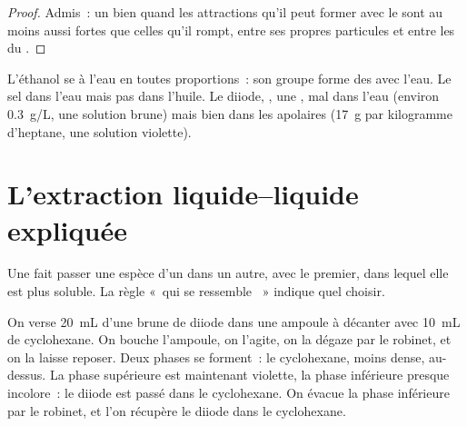 \begin{proof}
Admis~: un   bien quand les attractions qu'il peut
former avec le  sont au moins aussi fortes que celles qu'il
rompt, entre ses propres particules et entre les  du .
\end{proof}

\begin{example}\label{ex:g11:dissolution:cases}
L'éthanol se  à l'eau en toutes proportions~: son groupe 
forme des  avec l'eau. Le sel  dans l'eau
mais pas dans l'huile. Le diiode, , une ,  mal dans l'eau (environ \qty{0.3}{g/L}, une solution brune) mais
bien dans les  apolaires (\qty{17}{g} par kilogramme d'heptane,
une solution violette).
\end{example}

\section{L'extraction liquide--liquide expliquée}

Une  fait passer une espèce d'un  dans
un autre,  avec le premier, dans lequel elle est plus
soluble. La règle «~qui se ressemble ~» indique quel 
choisir.

\begin{inthelab}
On verse \qty{20}{mL} d'une  brune de diiode dans une
ampoule à décanter avec \qty{10}{mL} de cyclohexane. On bouche
l'ampoule, on l'agite, on la dégaze par le robinet, et on la laisse
reposer. Deux phases se forment~: le cyclohexane, moins dense, au-dessus.
La phase supérieure est maintenant violette, la phase inférieure presque
incolore~: le diiode est passé dans le cyclohexane. On évacue la phase
inférieure par le robinet, et l'on récupère le diiode dans le
cyclohexane.
\end{inthelab}

